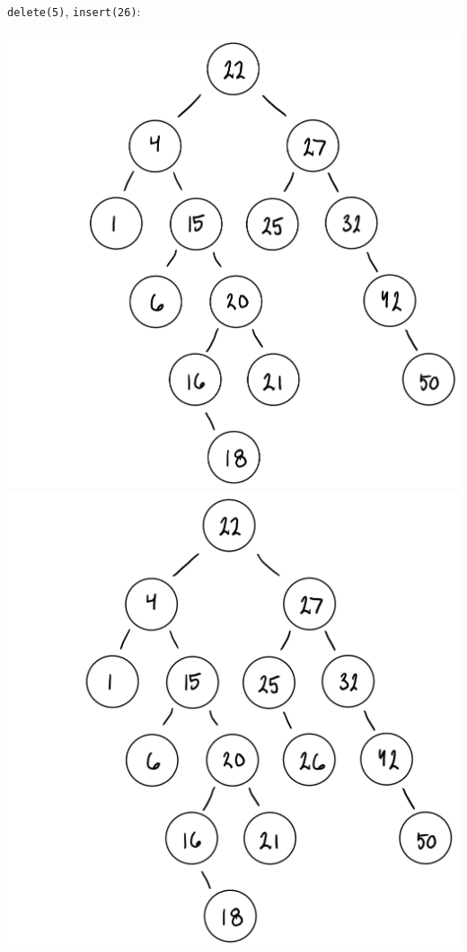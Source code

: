 \documentclass[12pt,twoside]{article}
\begin{document}
\begin{problems}
\begin{problemparts}
    {\tt delete(5)}, {\tt insert(26)}:

    \begin{center}
        \includegraphics[scale=0.25]{Images/P1A3.PNG}
        \includegraphics[scale=0.25]{Images/P1A4.PNG}
    \end{center}


\end{problemparts}
\end{problems}
\end{document}
